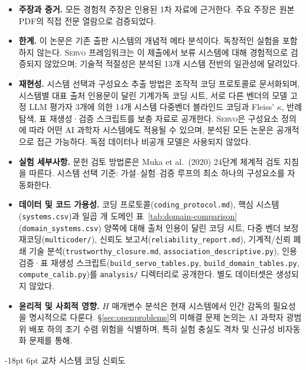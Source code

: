 \documentclass[11pt]{article}
\makeatletter
\renewcommand\section{\@startsection{section}{1}{\z@}%
  {-18pt \@plus -4pt \@minus -2pt}%
  {6pt \@plus 2pt}%
  {\normalfont\large\bfseries}}
\newcommand{\framework}{\textsc{Servo}}
\makeatother
\begin{document}
\begin{itemize}
  \item \textbf{주장과 증거.} 모든 경험적 주장은 인용된 1차 자료에 근거한다. 주요 주장은 원본 PDF의 직접 전문 열람으로 검증되었다.

  \item \textbf{한계.} 이 논문은 기존 출판 시스템의 개념적 메타 분석이다. 독창적인 실험을 포함하지 않는다. \framework{} 프레임워크는 이 제출에서 보류 시스템에 대해 경험적으로 검증되지 않았으며; 기술적 적절성은 분석된 13개 시스템 전반의 일관성에 달려있다.

  \item \textbf{재현성.} 시스템 선택과 구성요소 추출 방법은 조작적 코딩 프로토콜로 문서화되며, 시스템별 대표 출처 인용문이 달린 기계가독 코딩 시트, 서로 다른 벤더의 모델 고정 LLM 평가자 3개에 의한 14개 시스템 다중벤더 블라인드 코딩과 Fleiss' $\kappa$, 반례 탐색, 표 재생성·검증 스크립트를 보충 자료로 공개한다. \framework{}은 구성요소 정의에 따라 어떤 AI 과학자 시스템에도 적용될 수 있으며, 분석된 모든 논문은 공개적으로 접근 가능하다. 독점 데이터나 비공개 모델은 사용되지 않았다.

  \item \textbf{실험 세부사항.} 문헌 검토 방법론은 Muka et al.\ (2020) 24단계 체계적 검토 지침을 따른다. 시스템 선택 기준: 가설--실험--검증 루프의 최소 하나의 구성요소를 자동화한다.

  \item \textbf{데이터 및 코드 가용성.} 코딩 프로토콜(\texttt{coding\_protocol.md}), 핵심 시스템(\texttt{systems.csv})과 일곱 개 도메인 표~\ref{tab:domain-comparison}(\texttt{domain\_systems.csv}) 양쪽에 대해 출처 인용이 달린 코딩 시트, 다중 벤더 보정 재코딩(\texttt{multicoder/}), 신뢰도 보고서(\texttt{reliability\_report.md}), 기계적/신뢰 폐쇄 기술 분석(\texttt{trustworthy\_closure.md}, \texttt{association\_descriptive.py}), 인용 검증·표 재생성 스크립트(\texttt{build\_servo\_tables.py}, \texttt{build\_domain\_tables.py}, \texttt{compute\_calib.py})를 \texttt{analysis/} 디렉터리로 공개한다. 별도 데이터셋은 생성되지 않았다.

  \item \textbf{윤리적 및 사회적 영향.} $H$ 매개변수 분석은 현재 시스템에서 인간 감독의 필요성을 명시적으로 다룬다. §\ref{sec:openproblems}의 미해결 문제 논의는 AI 과학자 광범위 배포 하의 조기 수렴 위험을 식별하며, 특히 실험 충실도 격차 및 신규성 비자동화 문제를 통해.
\end{itemize}

\appendix
\section{교차 시스템 코딩 신뢰도}
\label{app:coding}
\end{document}
